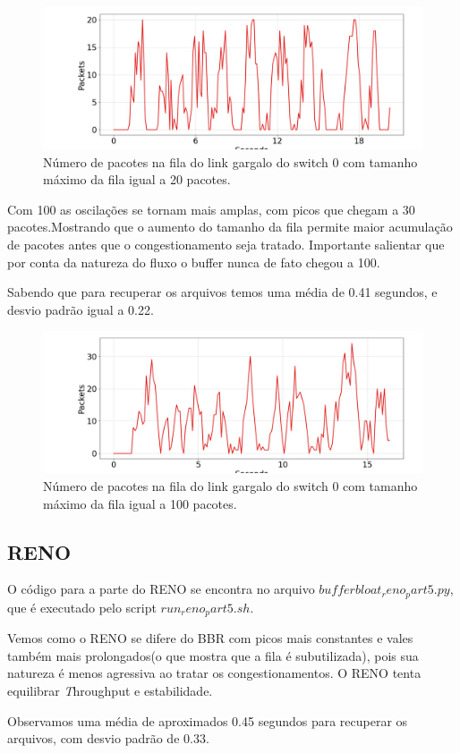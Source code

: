 \documentclass[a4paper,12pt]{article}
\begin{document}
\begin{figure}[ht!]
	\centering
	\includegraphics[width=0.5\columnwidth]{./bufferbloat/bb-q20/bbr-part5-buffer-q20.jpg}
	\caption{Número de pacotes na fila do link gargalo do switch 0 com tamanho máximo da fila igual a 20 pacotes.}
\end{figure}

Com 100 as oscilações se tornam mais amplas, com picos que chegam a 30 pacotes.Mostrando que o aumento do tamanho da fila permite maior acumulação de pacotes antes que o congestionamento seja tratado.
Importante salientar que por conta da natureza do fluxo o buffer nunca de fato chegou a 100.

Sabendo que para recuperar os arquivos temos uma média de 0.41 segundos, e desvio padrão igual a 0.22.

\begin{figure}[ht!]
	
	\centering
	\includegraphics[width=0.5\columnwidth]{./bufferbloat/bb-q100/bbr-part5-buffer-q100.jpg}
	\caption{Número de pacotes na fila do link gargalo do switch 0 com tamanho máximo da fila igual a 100 pacotes.}
\end{figure}


\subsection{RENO}

O código para a parte do RENO se encontra no arquivo $bufferbloat_reno_part5.py$, que é executado pelo script $run_reno_part5.sh$.

Vemos como o RENO se difere do BBR com picos mais constantes e vales também mais prolongados(o que mostra que a fila é subutilizada), pois sua natureza é menos agressiva ao tratar os congestionamentos. O RENO tenta equilibrar \textit Throughput e estabilidade.

Observamos uma média de aproximados 0.45 segundos para recuperar os arquivos, com desvio padrão de 0.33.
\end{document}
